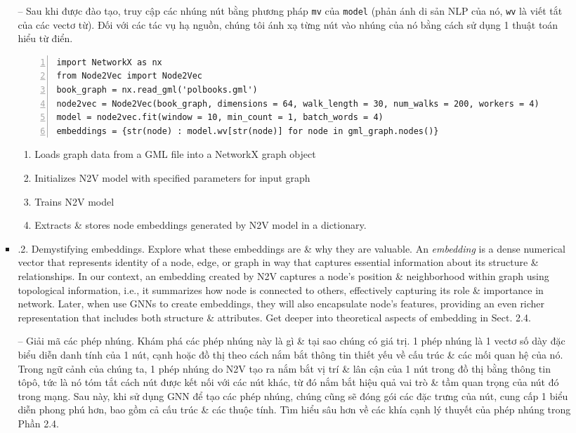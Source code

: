 \documentclass{article}
\begin{document}
\begin{itemize}
\begin{itemize}
\begin{itemize}
           -- Sau khi được đào tạo, truy cập các nhúng nút bằng phương pháp {\tt mv} của {\tt model} (phản ánh di sản NLP của nó, {\tt wv} là viết tắt của các vectơ từ). Đối với các tác vụ hạ nguồn, chúng tôi ánh xạ từng nút vào nhúng của nó bằng cách sử dụng 1 thuật toán hiểu từ điển.
           \begin{Verbatim}[numbers=left,xleftmargin=5mm]
import NetworkX as nx
from Node2Vec import Node2Vec
book_graph = nx.read_gml('polbooks.gml')
node2vec = Node2Vec(book_graph, dimensions = 64, walk_length = 30, num_walks = 200, workers = 4)
model = node2vec.fit(window = 10, min_count = 1, batch_words = 4)
embeddings = {str(node) : model.wv[str(node)] for node in gml_graph.nodes()}
           \end{Verbatim}
           \begin{enumerate}
               \item Loads graph data from a GML file into a NetworkX graph object
               \item Initializes N2V model with specified parameters for input graph
               \item Trains N2V model
               \item Extracts \& stores node embeddings generated by N2V model in a dictionary.
           \end{enumerate}
           \item {.2. Demystifying embeddings.} Explore what these embeddings are \& why they are valuable. An {\it embedding} is a dense numerical vector that represents identity of a node, edge, or graph in way that captures essential information about its structure \& relationships. In our context, an embedding created by N2V captures a node's position \& neighborhood within graph using topological information, i.e., it summarizes how node is connected to others, effectively capturing its role \& importance in network. Later, when use GNNs to create embeddings, they will also encapsulate node's features, providing an even richer representation that includes both structure \& attributes. Get deeper into theoretical aspects of embedding in Sect. 2.4.

           -- {\sf Giải mã các phép nhúng.} Khám phá các phép nhúng này là gì \& tại sao chúng có giá trị. 1 phép nhúng {\it} là 1 vectơ số dày đặc biểu diễn danh tính của 1 nút, cạnh hoặc đồ thị theo cách nắm bắt thông tin thiết yếu về cấu trúc \& các mối quan hệ của nó. Trong ngữ cảnh của chúng ta, 1 phép nhúng do N2V tạo ra nắm bắt vị trí \& lân cận của 1 nút trong đồ thị bằng thông tin tôpô, tức là nó tóm tắt cách nút được kết nối với các nút khác, từ đó nắm bắt hiệu quả vai trò \& tầm quan trọng của nút đó trong mạng. Sau này, khi sử dụng GNN để tạo các phép nhúng, chúng cũng sẽ đóng gói các đặc trưng của nút, cung cấp 1 biểu diễn phong phú hơn, bao gồm cả cấu trúc \& các thuộc tính. Tìm hiểu sâu hơn về các khía cạnh lý thuyết của phép nhúng trong Phần 2.4.


\end{itemize}
\end{itemize}
\end{itemize}
\end{document}
